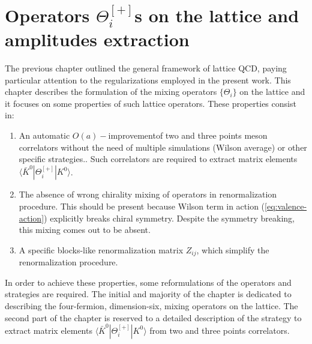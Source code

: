 \documentclass[english, LaM, oneside, noexaminfo]{sapthesis}
\newcommand{\la}{\langle}
\newcommand{\ra}{\rangle}
\newcommand{\oait}{$O(a)-$improvement}
\begin{document}
\chapter{Operators $\Theta_i^{[+]}$s on the lattice and amplitudes extraction}\label{ch:operators}
\lettrine[lines=2, findent=3pt, nindent=0pt]{T}{}he previous chapter outlined the general framework of lattice QCD, paying particular attention to the regularizations employed in the present work.
This chapter describes the formulation of the mixing operators $\{\Theta_i\}$ on the lattice and it focuses on some properties of such lattice operators.
These properties consist in:
\begin{enumerate}
    \item An automatic \oait\space of two and three points meson correlators without the need of multiple simulations (Wilson average) or other specific strategies..
        Such correlators are required to extract matrix elements $\la \bar K^0 | \Theta_i^{[+]} | K^0 \ra$.
    \item The absence of wrong chirality mixing of operators in renormalization procedure.
        This should be present because Wilson term in action (\ref{eq:valence-action}) explicitly breaks chiral symmetry.
        Despite the symmetry breaking, this mixing comes out to be absent.
    \item A specific blocks-like renormalization matrix $Z_{ij}$, which simplify the renormalization procedure.
\end{enumerate}

\noindent
In order to achieve these properties, some reformulations of the operators and strategies are required.
The initial and majority of the chapter is dedicated to describing the four-fermion, dimension-six, mixing operators on the lattice. 
The second part of the chapter is reserved to a detailed description of the strategy to extract matrix elements $\la \bar K^0 | \Theta_i^{[+]} | K^0 \ra$ from two and three points correlators.
\end{document}
